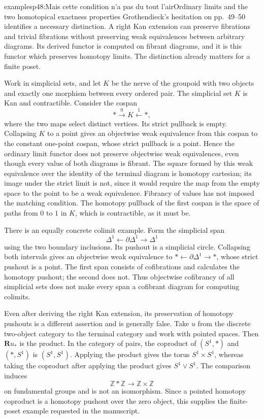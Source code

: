 \begin{dcomment}{examples}{p48:Mais cette condition n'a pas du tout l'air}{Ordinary limits and the two homotopical exactness properties}
Grothendieck's hesitation on pp.~49--50 identifies a necessary distinction. A right Kan extension can preserve fibrations and trivial fibrations without preserving weak equivalences between arbitrary diagrams. Its derived functor is computed on fibrant diagrams, and it is this functor which preserves homotopy limits. The distinction already matters for a finite poset.

Work in simplicial sets, and let $K$ be the nerve of the groupoid with two objects and exactly one morphism between every ordered pair. The simplicial set $K$ is Kan and contractible. Consider the cospan
\[
 *\xrightarrow{0}K\xleftarrow{1}*,
\]
where the two maps select distinct vertices. Its strict pullback is empty. Collapsing $K$ to a point gives an objectwise weak equivalence from this cospan to the constant one-point cospan, whose strict pullback is a point. Hence the ordinary limit functor does not preserve objectwise weak equivalences, even though every value of both diagrams is fibrant. The square formed by this weak equivalence over the identity of the terminal diagram is homotopy cartesian; its image under the strict limit is not, since it would require the map from the empty space to the point to be a weak equivalence. Fibrancy of values has not imposed the matching condition. The homotopy pullback of the first cospan is the space of paths from $0$ to $1$ in $K$, which is contractible, as it must be.

There is an equally concrete colimit example. Form the simplicial span
\[
 \Delta^1\longleftarrow\partial\Delta^1\longrightarrow\Delta^1
\]
using the two boundary inclusions. Its pushout is a simplicial circle. Collapsing both intervals gives an objectwise weak equivalence to $*\leftarrow\partial\Delta^1\to *$, whose strict pushout is a point. The first span consists of cofibrations and calculates the homotopy pushout; the second does not. Thus objectwise cofibrancy of all simplicial sets does not make every span a cofibrant diagram for computing colimits.

Even after deriving the right Kan extension, its preservation of homotopy pushouts is a different assertion and is generally false. Take $u$ from the discrete two-object category to the terminal category and work with pointed spaces. Then $\mathbf R u_*$ is the product. In the category of pairs, the coproduct of $(S^1,*)$ and $(*,S^1)$ is $(S^1,S^1)$. Applying the product gives the torus $S^1\times S^1$, whereas taking the coproduct after applying the product gives $S^1\vee S^1$. The comparison induces
\[
 \mathbb Z*\mathbb Z\longrightarrow\mathbb Z\times\mathbb Z
\]
on fundamental groups and is not an isomorphism. Since a pointed homotopy coproduct is a homotopy pushout over the zero object, this supplies the finite-poset example requested in the manuscript.


\end{dcomment}
